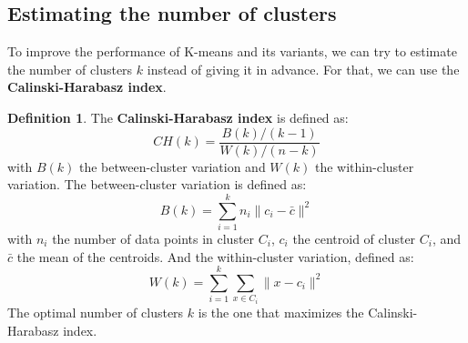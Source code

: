\documentclass[12pt, openany]{report}
\theoremstyle{definition}
\newtheorem{definition}[thm]{Definition}
\begin{document}
\subsection{Estimating the number of clusters}
To improve the performance of K-means and its variants, we can try to estimate the number of clusters $k$ instead of giving it in advance. For that, we can use the \textbf{Calinski-Harabasz index}.
\begin{definition}
    The \textbf{Calinski-Harabasz index} is defined as:
    \begin{equation}
        CH(k) = \frac{B(k) / (k - 1)}{W(k) / (n - k)}
    \end{equation}
    with $B(k)$ the between-cluster variation and $W(k)$ the within-cluster variation. The between-cluster variation is defined as:
    \begin{equation}
        B(k) = \sum_{i=1}^{k} n_i \|c_i - \bar{c}\|^2
    \end{equation}
    with $n_i$ the number of data points in cluster $C_i$, $c_i$ the centroid of cluster $C_i$, and $\bar{c}$ the mean of the centroids. And the within-cluster variation, defined as:
    \begin{equation}
        W(k) = \sum_{i=1}^{k} \sum_{x \in C_i} \|x - c_i\|^2
    \end{equation}
    The optimal number of clusters $k$ is the one that maximizes the Calinski-Harabasz index.
\end{definition}
\end{document}
